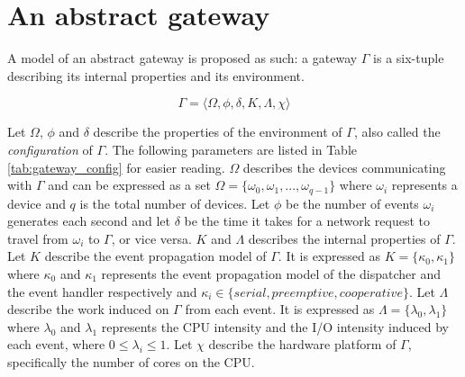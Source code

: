 \section{An abstract gateway}

A model of an abstract gateway is proposed as such: a gateway $\Gamma$ is a
six-tuple describing its internal properties and its environment.

\begin{equation}
\Gamma = \big \langle \Omega, \phi, \delta, K, \Lambda, \chi \big \rangle
\end{equation}

Let $\Omega$, $\phi$ and $\delta$ describe the properties of the environment of
$\Gamma$, also called the \textit{configuration} of $\Gamma$. The following
parameters are listed in Table \ref{tab:gateway_config} for easier reading.
$\Omega$ describes the devices communicating with $\Gamma$ and can be expressed
as a set $\Omega = \{ \omega_0, \omega_1, ..., \omega_{q-1} \}$ where
$\omega_i$ represents a device and $q$ is the total number of devices. Let
$\phi$ be the number of events $\omega_i$ generates each second and let
$\delta$ be the time it takes for a network request to travel from $\omega_i$
to $\Gamma$, or vice versa. $K$ and $\Lambda$ describes the internal properties
of $\Gamma$. Let $K$ describe the event propagation model of $\Gamma$. It is
expressed as $K = \{ \kappa_0, \kappa_1 \}$ where $\kappa_0$ and $\kappa_1$
represents the event propagation model of the dispatcher and the event handler
respectively and $\kappa_i \in \{ \textit{serial}, \textit{preemptive},
\textit{cooperative} \}$. Let $\Lambda$ describe the work induced on $\Gamma$
from each event. It is expressed as $\Lambda = \{ \lambda_0, \lambda_1 \}$
where $\lambda_0$ and $\lambda_1$ represents the CPU intensity and the I/O
intensity induced by each event, where $0 \leq \lambda_i \leq 1$. Let $\chi$
describe the hardware platform of $\Gamma$, specifically the number of cores on
the CPU.

